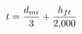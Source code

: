\documentclass[preview]{standalone}
\begin{document}
\begin{align*}
t = { d_{ mi } \over 3 } + { h_{ ft } \over 2{,}000 }
\end{align*}
\end{document}
